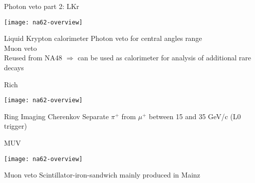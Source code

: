 \begin{frame}{Photon veto part 2: LKr}{}
	\begin{center} 
		\texttt{[image: na62-overview]}
	\end{center}
	\begin{block}{Liquid Krypton calorimeter}
		Photon veto for central angles range\\
		Muon veto \\
		Reused from NA48 $\Rightarrow$ can be used as calorimeter for analysis of
		additional rare decays
	\end{block}
\end{frame}

\begin{frame}{Rich}{}
	\begin{center} 
		\texttt{[image: na62-overview]}
	\end{center}
	\begin{block}{Ring Imaging Cherenkov}
		Separate $\pi^+$ from $\mu^+$ between 15 and 35 GeV/c (L0 trigger)
	\end{block}
\end{frame}



\begin{frame}{MUV}{}
	\begin{center} 
		\texttt{[image: na62-overview]}
	\end{center}
	\begin{block}{Muon veto}
		Scintillator-iron-sandwich mainly produced in Mainz 
	\end{block}
\end{frame}


